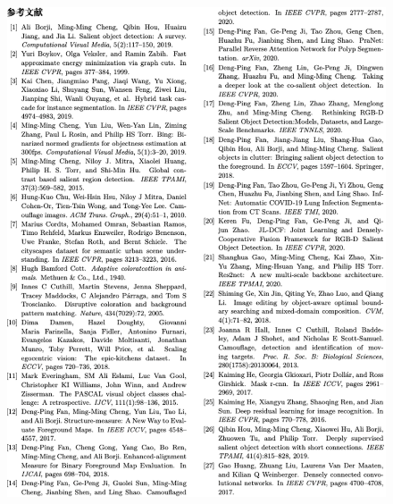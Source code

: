 \documentclass[final]{cvpr}
\begin{document}
\begin{figure}[tp]
    \centering
    \includegraphics[width=\textwidth]{COD_Zh_translate/figures/ref1.png}\small
\end{figure}
\end{document}
